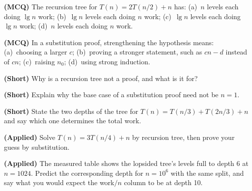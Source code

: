 \begin{reviewq}
  \item \textbf{(MCQ)} The recursion tree for $T(n) = 2T(n/2)+n$ has:
        (a)~$n$ levels each doing $\lg n$ work; (b)~$\lg n$ levels each doing
        $n$ work; (c)~$\lg n$ levels each doing $\lg n$ work; (d)~$n$ levels
        each doing $n$ work.
  \item \textbf{(MCQ)} In a substitution proof, strengthening the hypothesis
        means: (a)~choosing a larger $c$; (b)~proving a stronger statement,
        such as $cn - d$ instead of $cn$; (c)~raising $n_{0}$; (d)~using strong
        induction.
  \item \textbf{(Short)} Why is a recursion tree not a proof, and what is it
        for?
  \item \textbf{(Short)} Explain why the base case of a substitution proof need
        not be $n = 1$.
  \item \textbf{(Short)} State the two depths of the tree for
        $T(n)=T(n/3)+T(2n/3)+n$ and say which one determines the total work.
  \item \textbf{(Applied)} Solve $T(n) = 3T(n/4) + n$ by recursion tree, then
        prove your guess by substitution.
  \item \textbf{(Applied)} The measured table shows the lopsided tree's levels
        full to depth 6 at $n = 1024$. Predict the corresponding depth for
        $n = 10^{6}$ with the same split, and say what you would expect the
        work$/n$ column to be at depth 10.
\end{reviewq}
